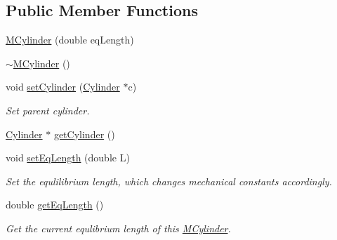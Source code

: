 \subsection*{Public Member Functions}
\begin{DoxyCompactItemize}
\item 
\hyperlink{classMCylinder_aebb2581fd3b7d43a0d5fa166e388691b}{M\+Cylinder} (double eq\+Length)
\item 
\hyperlink{classMCylinder_aeff5ed74bb8bffb0ac7e934f399851c6}{$\sim$\+M\+Cylinder} ()
\item 
void \hyperlink{classMCylinder_a83c3f990d2eab221b1007a04f3bf7d12}{set\+Cylinder} (\hyperlink{classCylinder}{Cylinder} $\ast$c)
\begin{DoxyCompactList}\small\item\em Set parent cylinder. \end{DoxyCompactList}\item 
\hyperlink{classCylinder}{Cylinder} $\ast$ \hyperlink{classMCylinder_aabfcc013b8cbc9af120936a0792c5167}{get\+Cylinder} ()
\item 
void \hyperlink{classMCylinder_a3f71512d5957c9a6682ddb424f05f038}{set\+Eq\+Length} (double L)
\begin{DoxyCompactList}\small\item\em Set the equlilibrium length, which changes mechanical constants accordingly. \end{DoxyCompactList}\item 
double \hyperlink{classMCylinder_a7c36dea92cebddaa04c01390debc18dd}{get\+Eq\+Length} ()
\begin{DoxyCompactList}\small\item\em Get the current equlibrium length of this \hyperlink{classMCylinder}{M\+Cylinder}. \end{DoxyCompactList}\end{DoxyCompactItemize}
{\bf }\par
